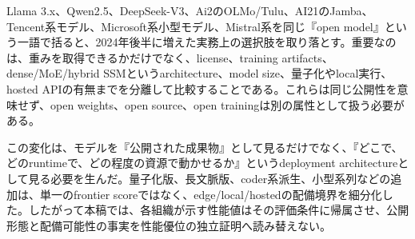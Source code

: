Llama 3.x、Qwen2.5、DeepSeek-V3、Ai2のOLMo/Tulu、AI21のJamba、Tencent系モデル、Microsoft系小型モデル、Mistral系を同じ『open model』という一語で括ると、2024年後半に増えた実務上の選択肢を取り落とす。重要なのは、重みを取得できるかだけでなく、license、training artifacts、dense/MoE/hybrid SSMというarchitecture、model size、量子化やlocal実行、hosted APIの有無までを分離して比較することである。これらは同じ公開性を意味せず、open weights、open source、open trainingは別の属性として扱う必要がある。\autocite{src-042479f9308f,src-16b95c7a8737,src-24aefc391976,src-5b3150b68247,src-7882832e3ea8,src-8f8555b73e1b,src-9d854c1d7239,src-ae11d62632e2,src-dabb3f4afb75,src-e40065b96e7c,src-e8f0a037900e}


この変化は、モデルを『公開された成果物』として見るだけでなく、『どこで、どのruntimeで、どの程度の資源で動かせるか』というdeployment architectureとして見る必要を生んだ。量子化版、長文脈版、coder系派生、小型系列などの追加は、単一のfrontier scoreではなく、edge/local/hostedの配備境界を細分化した。したがって本稿では、各組織が示す性能値はその評価条件に帰属させ、公開形態と配備可能性の事実を性能優位の独立証明へ読み替えない。\autocite{src-22a7228f1409,src-bcbc025369e3,src-ecac5d71389f,src-ee43656ed6da}


